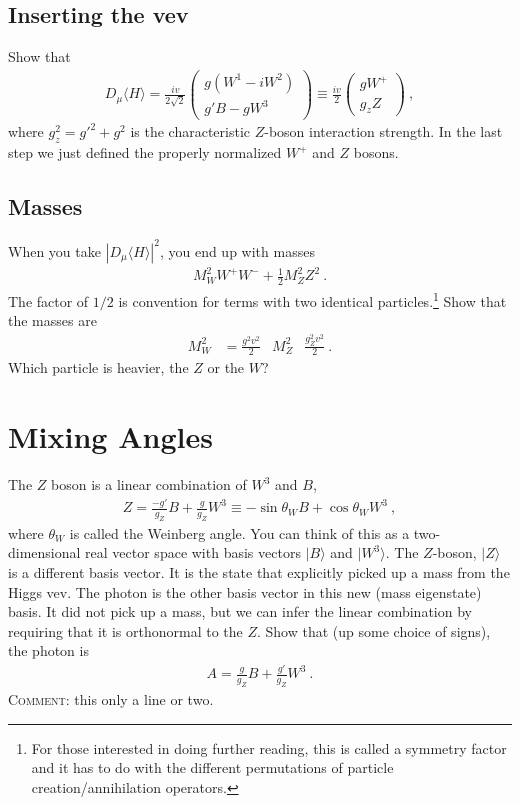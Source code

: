 \documentclass[12pt]{article}
\numberwithin{equation}{section}    %
\begin{document}
\subsection{Inserting the vev}

Show that
\begin{align}
	D_\mu \langle H \rangle = \frac{i v}{2\sqrt{2}}
	\begin{pmatrix}
		g\left(W^1 - i W^2\right) \\
		g'B - g W^3
	\end{pmatrix}
	\equiv 
	\frac{i v}{2}
	\begin{pmatrix}
		gW^+ \\
		g_z Z
	\end{pmatrix} \ ,
\end{align}
where $g_z^2 = g'^2 + g^2$ is the characteristic $Z$-boson interaction strength. In the last step we just defined the properly normalized $W^+$ and $Z$ bosons. 


\subsection{Masses }
When you take $|D_\mu \langle H\rangle|^2$, you end up with masses
\begin{align}
	M_W^2 W^+W^- + \frac{1}{2} M_Z^2 Z^2 \ .
\end{align}
The factor of $1/2$ is convention for terms with two identical particles.\footnote{For those interested in doing further reading, this is called a symmetry factor and it has to do with the different permutations of particle creation/annihilation operators.} Show that the masses are
\begin{align}
	M_W^2 &= \frac{g^2v^2}{2}
	&
	M_Z^2 & \frac{g_Z^2v^2}{2} \ .
\end{align}
Which particle is heavier, the $Z$ or the $W$? 

\section{Mixing Angles}

The $Z$ boson is a linear combination of $W^3$ and $B$,
\begin{align}
	Z = \frac{-g'}{g_Z} B + \frac{g}{g_Z} W^3
	\equiv
	-\sin\theta_W B + \cos\theta_W W^3 \ ,
\end{align}
where $\theta_W$ is called the Weinberg angle. You can think of this as a two-dimensional real vector space with basis vectors $|B\rangle$ and $|W^3\rangle$. The $Z$-boson, $|Z\rangle$ is a different basis vector. It is the state that explicitly picked up a mass from the Higgs vev. The photon is the other basis vector in this new (mass eigenstate) basis. It did not pick up a mass, but we can infer the linear combination by requiring that it is orthonormal to the $Z$. Show that (up some choice of signs), the photon is
\begin{align}
	A = \frac{g}{g_Z} B + \frac{g'}{g_Z} W^3 \ .
\end{align}
\textsc{Comment:} this only a line or two. 
\end{document}
